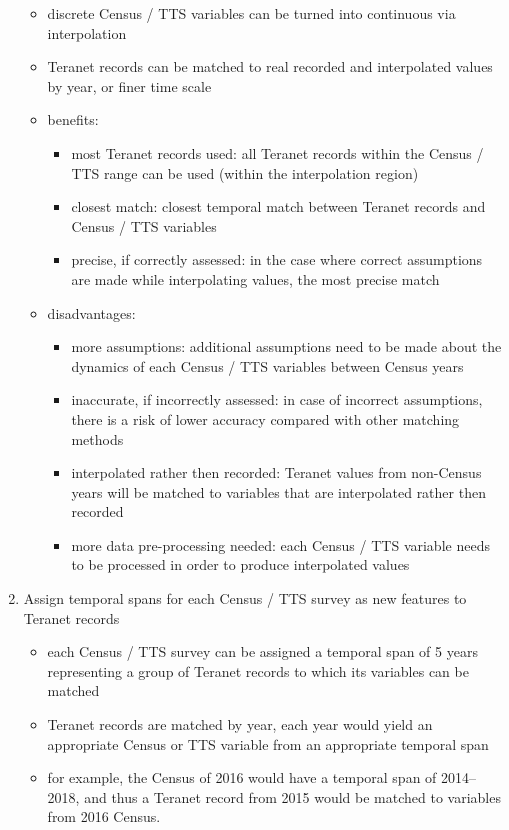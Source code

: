 \begin{enumerate}
\begin{itemize}
        \item discrete Census / TTS variables can be turned into continuous via interpolation
        \item Teranet records can be matched to real recorded and interpolated values by year, or finer time scale
        \item benefits:
        \begin{itemize}
            \item most Teranet records used: all Teranet records within the Census / TTS range can be used (within the interpolation region)
            \item closest match: closest temporal match between Teranet records and Census / TTS variables
            \item precise, if correctly assessed: in the case where correct assumptions are made while interpolating values, the most precise match
        \end{itemize}
        \item disadvantages:
        \begin{itemize}
            \item more assumptions: additional assumptions need to be made about the dynamics of each Census / TTS variables between Census years
            \item inaccurate, if incorrectly assessed: in case of incorrect assumptions, there is a risk of lower accuracy compared with other matching methods
            \item interpolated rather then recorded: Teranet values from non-Census years will be matched to variables that are interpolated rather then recorded
            \item more data pre-processing needed: each Census / TTS variable needs to be processed in order to produce interpolated values
        \end{itemize}
    \end{itemize}
    \item Assign temporal spans for each Census / TTS survey as new features to Teranet records
    \begin{itemize}
        \item each Census / TTS survey can be assigned a temporal span of 5 years representing a group of Teranet records to which its variables can be matched
        \item Teranet records are matched by year, each year would yield an appropriate Census or TTS variable from an appropriate temporal span
        \item for example, the Census of 2016 would have a temporal span of 2014--2018, and thus a Teranet record from 2015 would be matched to variables from 2016 Census.

\end{itemize}
\end{enumerate}
